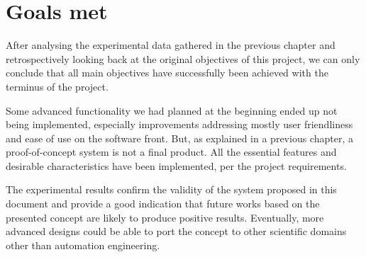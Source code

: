 \section{Goals met} \label{sec:goals-met}
After analysing the experimental data gathered in the previous chapter and retrospectively looking back at the original objectives of this project, we can only conclude that all main objectives have successfully been achieved with the terminus of the project.

Some advanced functionality we had planned at the beginning ended up not being implemented, especially improvements addressing mostly user friendliness and ease of use on the software front.
But, as explained in a previous chapter, a proof-of-concept system is not a final product.
All the essential features and desirable characteristics have been implemented, per the project requirements.

The experimental results confirm the validity of the system proposed in this document and provide a good indication that future works based on the presented concept are likely to produce positive results.
Eventually, more advanced designs could be able to port the concept to other scientific domains other than automation engineering.
